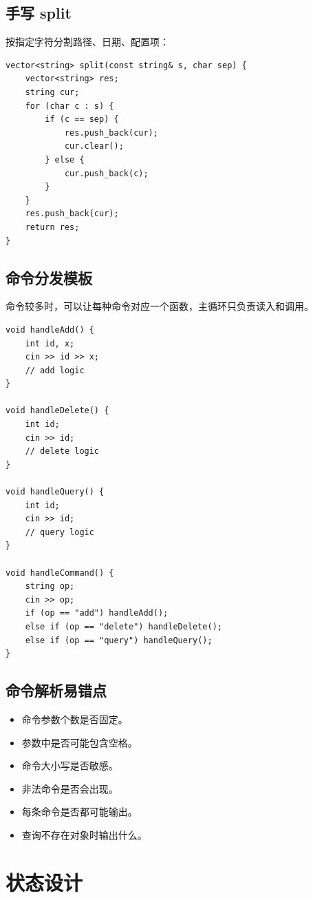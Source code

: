 \subsection{手写 split}

按指定字符分割路径、日期、配置项：

\begin{lstlisting}
vector<string> split(const string& s, char sep) {
    vector<string> res;
    string cur;
    for (char c : s) {
        if (c == sep) {
            res.push_back(cur);
            cur.clear();
        } else {
            cur.push_back(c);
        }
    }
    res.push_back(cur);
    return res;
}
\end{lstlisting}

\subsection{命令分发模板}

命令较多时，可以让每种命令对应一个函数，主循环只负责读入和调用。

\begin{lstlisting}
void handleAdd() {
    int id, x;
    cin >> id >> x;
    // add logic
}

void handleDelete() {
    int id;
    cin >> id;
    // delete logic
}

void handleQuery() {
    int id;
    cin >> id;
    // query logic
}

void handleCommand() {
    string op;
    cin >> op;
    if (op == "add") handleAdd();
    else if (op == "delete") handleDelete();
    else if (op == "query") handleQuery();
}
\end{lstlisting}

\subsection{命令解析易错点}

\begin{itemize}
  \item 命令参数个数是否固定。
  \item 参数中是否可能包含空格。
  \item 命令大小写是否敏感。
  \item 非法命令是否会出现。
  \item 每条命令是否都可能输出。
  \item 查询不存在对象时输出什么。
\end{itemize}

\section{状态设计}\label{sec:07-12}

